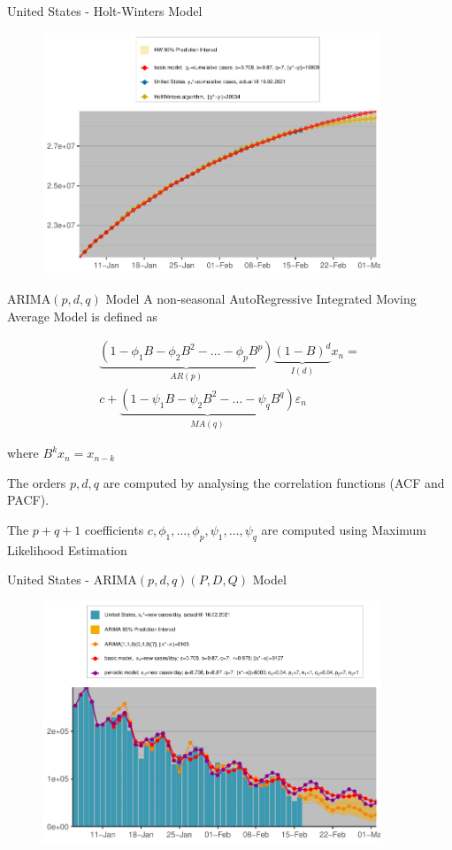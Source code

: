 \documentclass{beamer}
\def\eps{\varepsilon}
\begin{document}
\begin{frame}{United States - Holt-Winters Model}
\begin{figure}
\includegraphics[width=0.9\textwidth]{Plots/United States-hwy.pdf}
\end{figure}
\end{frame}

\begin{frame}{ARIMA$(p,d,q)$ Model}
  A non-seasonal AutoRegressive Integrated Moving Average Model is defined as
  
\begin{align}
\underbrace{\left(1-\phi_1 B-\phi_2B^2-\dots-\phi_p B^p\right)}_{AR(p)}
\underbrace{\left(1-B\right)^d}_{I(d)} x_n = \nonumber \\
 c+
\underbrace{\left(1-\psi_1 B-\psi_2B^2-\dots-\psi_q B^q\right)}_{MA(q)} \eps_n \nonumber
\end{align}

where $B^k x_n = x_{n-k}$

The orders $p,d,q$ are computed by analysing the correlation functions (ACF and PACF).

The $p+q+1$ coefficients $c,\phi_1,\dots,\phi_p,\psi_1,\dots,\psi_q$ are computed using Maximum Likelihood Estimation
\end{frame}

\begin{frame}{United States - ARIMA$(p,d,q)(P,D,Q)$ Model}
\begin{figure}
\includegraphics[width=0.9\textwidth]{Plots/United States-arima.pdf}
\end{figure}
\end{frame}
\end{document}
